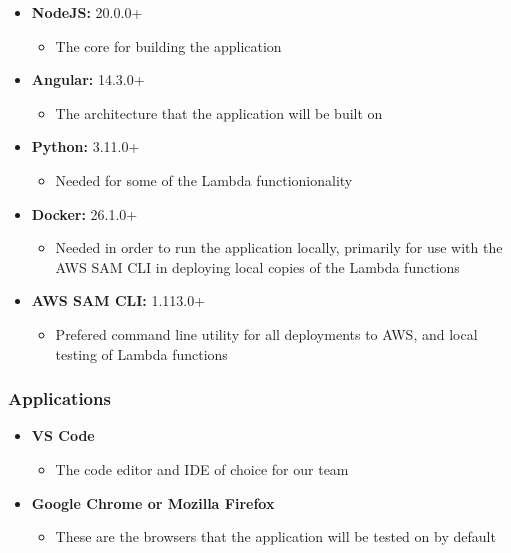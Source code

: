 \documentclass[12pt]{article}
\begin{document}
\begin{itemize}
    \item \textbf{NodeJS:} 20.0.0+
          \begin{itemize}
              \item The core for building the application
          \end{itemize}
    \item \textbf{Angular:} 14.3.0+
          \begin{itemize}
              \item The architecture that the application will be built on
          \end{itemize}
    \item \textbf{Python:} 3.11.0+
          \begin{itemize}
              \item Needed for some of the Lambda functionionality
          \end{itemize}
    \item \textbf{Docker:} 26.1.0+
          \begin{itemize}
              \item Needed in order to run the application locally, primarily for use with the AWS SAM CLI in deploying local copies of the Lambda functions
          \end{itemize}
    \item \textbf{AWS SAM CLI:} 1.113.0+
          \begin{itemize}
              \item Prefered command line utility for all deployments to AWS, and local testing of Lambda functions
          \end{itemize}
\end{itemize}

\subsubsection{Applications}

\begin{itemize}
    \item \textbf{VS Code}
          \begin{itemize}
              \item The code editor and IDE of choice for our team
          \end{itemize}
    \item \textbf{Google Chrome or Mozilla Firefox}
          \begin{itemize}
              \item These are the browsers that the application will be tested on by default
          \end{itemize}
\end{itemize}
\end{document}
